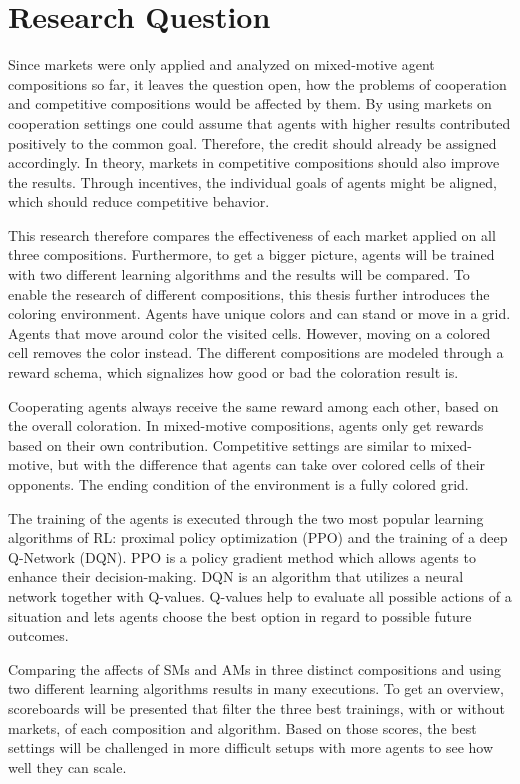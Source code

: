 \section{Research Question}

Since markets were only applied and analyzed on mixed-motive agent compositions so far, it leaves the question open, how the problems of cooperation and competitive compositions would be affected by them. By using markets on cooperation settings one could assume that agents with higher results contributed positively to the common goal. Therefore, the credit should already be assigned accordingly. In theory, markets in competitive compositions should also improve the results. Through incentives, the individual goals of agents might be aligned, which should reduce competitive behavior.

This research therefore compares the effectiveness of each market applied on all three compositions. Furthermore, to get a bigger picture, agents will be trained with two different learning algorithms and the results will be compared. To enable the research of different compositions, this thesis further introduces the coloring environment. Agents have unique colors and can stand or move in a grid. Agents that move around color the visited cells. However, moving on a colored cell removes the color instead. The different compositions are modeled through a reward schema, which signalizes how good or bad the coloration result is. 

Cooperating agents always receive the same reward among each other, based on the overall coloration. In mixed-motive compositions, agents only get rewards based on their own contribution. Competitive settings are similar to mixed-motive, but with the difference that agents can take over colored cells of their opponents. The ending condition of the environment is a fully colored grid.

The training of the agents is executed through the two most popular learning algorithms of RL: proximal policy optimization (PPO) and the training of a deep Q-Network (DQN). PPO is a policy gradient method which allows agents to enhance their decision-making. DQN is an algorithm that utilizes a neural network together with Q-values. Q-values help to evaluate all possible actions of a situation and lets agents choose the best option in regard to possible future outcomes.

Comparing the affects of SMs and AMs in three distinct compositions and using two different learning algorithms results in many executions. To get an overview, scoreboards will be presented that filter the three best trainings, with or without markets, of each composition and algorithm. Based on those scores, the best settings will be challenged in more difficult setups with more agents to see how well they can scale.

